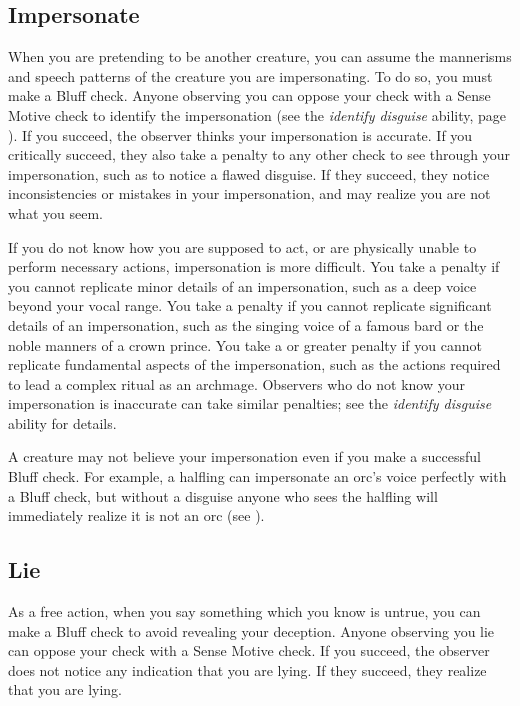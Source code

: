     \subsection{Impersonate}\label{Impersonate}
        When you are pretending to be another creature, you can assume the mannerisms and speech patterns of the creature you are impersonating.
        To do so, you must make a Bluff check.
        Anyone observing you can oppose your check with a Sense Motive check to identify the impersonation (see the \textit{identify disguise} ability, page ).
        If you succeed, the observer thinks your impersonation is accurate.
        If you critically succeed, they also take a  penalty to any other check to see through your impersonation, such as to notice a flawed disguise.
        If they succeed, they notice inconsistencies or mistakes in your impersonation, and may realize you are not what you seem.

        If you do not know how you are supposed to act, or are physically unable to perform necessary actions, impersonation is more difficult.
        You take a  penalty if you cannot replicate minor details of an impersonation, such as a deep voice beyond your vocal range.
        You take a  penalty if you cannot replicate significant details of an impersonation, such as the singing voice of a famous bard or the noble manners of a crown prince.
        You take a  or greater penalty if you cannot replicate fundamental aspects of the impersonation, such as the actions required to lead a complex ritual as an archmage.
        Observers who do not know your impersonation is inaccurate can take similar penalties; see the \textit{identify disguise} ability for details.

        A creature may not believe your impersonation even if you make a successful Bluff check.
        For example, a halfling can impersonate an orc's voice perfectly with a Bluff check, but without a disguise anyone who sees the halfling will immediately realize it is not an orc (see ).

    \subsection{Lie}
        As a free action, when you say something which you know is untrue, you can make a Bluff check to avoid revealing your deception.
        Anyone observing you lie can oppose your check with a Sense Motive check.
        If you succeed, the observer does not notice any indication that you are lying.
        If they succeed, they realize that you are lying.

